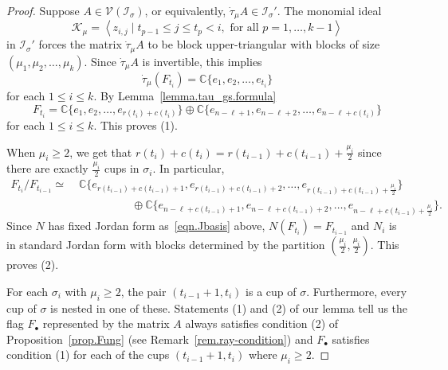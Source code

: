\documentclass[11pt]{amsart}
\theoremstyle{remark}
\theoremstyle{remark}
\theoremstyle{definition}
\theoremstyle{definition}
\theoremstyle{definition}
\numberwithin{equation}{section}
\newcommand{\C}{\mathbb{C}}           %
\newcommand{\gs}{\sigma}
\newcommand{\ci}{\mathcal{I}}
\newcommand{\isigma}{\ci_\gs}
\newcommand{\parsum}{t}
\begin{document}
\begin{proof} Suppose $A\in \mathcal{V}(\isigma)$, or equivalently, $\dot \tau_\mu A\in \mathcal{\isigma'}$. 
The monomial ideal 
\[
\mathcal{K}_\mu = \left< z_{i,j} \mid \parsum_{p-1}\leq j \leq \parsum_p <i , \text{ for all } p=1, \ldots, k-1 \right>
\]
in $\ci_{\gs}'$ forces the matrix $\dot\tau_\mu A$ to be block upper-triangular with blocks of size $(\mu_1, \mu_2, \ldots, \mu_k)$. Since $\dot\tau_\mu A$ is invertible, this implies
\[
\dot \tau_\mu (F_{\parsum_i}) = \C\{e_1, e_2, \ldots, e_{\parsum_i }\}
\]
for each $1\leq i \leq k$. By Lemma~\ref{lemma.tau_gs.formula} 
\[
F_{\parsum_i} = \C\{e_1, e_2, \ldots, e_{r(\parsum_i)+c(\parsum_i)}\}\oplus \C\{e_{n-\ell + 1}, e_{n-\ell+2}, \ldots, e_{n-\ell+c(\parsum_i)}\}
\]
for each $1\leq i \leq k$. This proves (1). 

When $\mu_i\geq 2$, we get that $r(\parsum_i)+c(\parsum_i) = r(\parsum_{i-1}) +c(\parsum_{i-1})+\frac{\mu_i}{2}$ since there are exactly $\frac{\mu_i}{2}$ cups in $\gs_i$. In particular,
\begin{align*}
F_{\parsum_i}/F_{\parsum_{i-1}} \simeq &\; \C\{e_{r(\parsum_{i-1})+c(\parsum_{i-1}) +1}, e_{r(\parsum_{i-1})+c(\parsum_{i-1}) +2},\ldots,  e_{r(\parsum_{i-1})+c(\parsum_{i-1}) +\frac{\mu_i}{2}}  \}\\ 
&\quad \qquad \qquad  \oplus \C\{ e_{n-\ell +c(\parsum_{i-1})+1}, e_{n-\ell +c(\parsum_{i-1})+2}, \ldots, e_{n-\ell +c(\parsum_{i-1})+\frac{\mu_i}{2}} \}.
\end{align*}
Since $N$ has fixed Jordan form as~\eqref{eqn.Jbasis} above, $N(F_{\parsum_i}) = F_{\parsum_{i-1}}$ and $N_i$ is in standard Jordan form with blocks determined by the partition $(\frac{\mu_i}{2}, \frac{\mu_i}{2})$. This proves (2). 

For each $\gs_i$ with $\mu_i\geq 2$, the pair $(\parsum_{i-1}+1, \parsum_{i})$ is a cup of $\gs$. Furthermore, every cup of $\gs$ is nested in one of these.  Statements (1) and (2) of our lemma tell us the flag $F_\bullet$ represented by the matrix $A$ always satisfies condition (2) of Proposition~\ref{prop.Fung} (see Remark~\ref{rem.ray-condition}) and $F_\bullet$ satisfies condition (1) for each of the cups $(\parsum_{i-1}+1, \parsum_{i})$ where $\mu_i\geq 2$. 


\end{proof}
\end{document}
